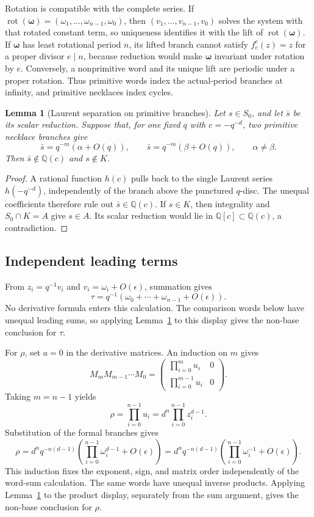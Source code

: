 \documentclass[11pt]{article}
\newtheorem{lemma}[theorem]{Lemma}
\theoremstyle{definition}
\theoremstyle{remark}
\newcommand{\Q}{\mathbb{Q}}
\newcommand{\bw}{\boldsymbol{\omega}}
\begin{document}
Rotation is compatible with the complete series.  If
$\operatorname{rot}(\bw)=(\omega_1,\ldots,\omega_{n-1},\omega_0)$, then
$(v_1,\ldots,v_{n-1},v_0)$ solves the system with that rotated constant
term, so uniqueness identifies it with the lift of
$\operatorname{rot}(\bw)$.  If $\bw$ has least rotational period $n$, its
lifted branch cannot
satisfy $f_c^e(z)=z$ for a proper divisor $e\mid n$, because reduction would
make $\bw$ invariant under rotation by $e$.  Conversely, a nonprimitive word
and its unique lift are periodic under a proper rotation.  Thus primitive
words index the actual-period branches at infinity, and primitive necklaces
index cycles.

\begin{lemma}[Laurent separation on primitive branches]
\label{lem:laurent-separation}
Let $s\in S_0$, and let $\bar s$ be its scalar reduction.  Suppose that, for
one fixed $q$ with $c=-q^{-d}$, two primitive necklace branches give
\[
 \bar s=q^{-m}(\alpha+O(q)),
 \qquad
 \bar s=q^{-m}(\beta+O(q)),
 \qquad \alpha\ne\beta.
\]
Then $\bar s\notin\Q(c)$ and $s\notin K$.
\end{lemma}

\begin{proof}
A rational function $h(c)$ pulls back to the single Laurent series
$h(-q^{-d})$, independently of the branch above the punctured $q$-disc.
The unequal coefficients therefore rule out $\bar s\in\Q(c)$.  If
$s\in K$, then integrality and $S_0\cap K=A$ give $s\in A$.  Its scalar
reduction would lie in $\Q[c]\subset\Q(c)$, a contradiction.
\end{proof}

\subsection{Independent leading terms}

From $z_i=q^{-1}v_i$ and
$v_i=\omega_i+O(\epsilon)$, summation gives
\[
 \tau=q^{-1}
 \left(\omega_0+\cdots+\omega_{n-1}+O(\epsilon)\right).
\]
No derivative formula enters this calculation.
The comparison words below have unequal leading sums, so applying
Lemma~\ref{lem:laurent-separation} to this display gives the non-base
conclusion for $\tau$.

For $\rho$, set $a=0$ in the derivative matrices.  An induction on
$m$ gives
\[
 M_mM_{m-1}\cdots M_0
 =
 \begin{pmatrix}
 \prod_{i=0}^{m}u_i&0\\
 \prod_{i=0}^{m-1}u_i&0
 \end{pmatrix}.
\]
Taking $m=n-1$ yields
\[
 \rho=\prod_{i=0}^{n-1}u_i
 =d^n\prod_{i=0}^{n-1}z_i^{d-1}.
\]
Substitution of the formal branches gives
\[
 \rho=d^nq^{-n(d-1)}
 \left(\prod_{i=0}^{n-1}\omega_i^{d-1}
 +O(\epsilon)\right)
 =d^nq^{-n(d-1)}
 \left(\prod_{i=0}^{n-1}\omega_i^{-1}
 +O(\epsilon)\right).
\]
This induction fixes the exponent, sign, and matrix order independently of
the word-sum calculation.
The same words have unequal inverse products.  Applying
Lemma~\ref{lem:laurent-separation} to the product display, separately from
the sum argument, gives the non-base conclusion for $\rho$.
\end{document}
